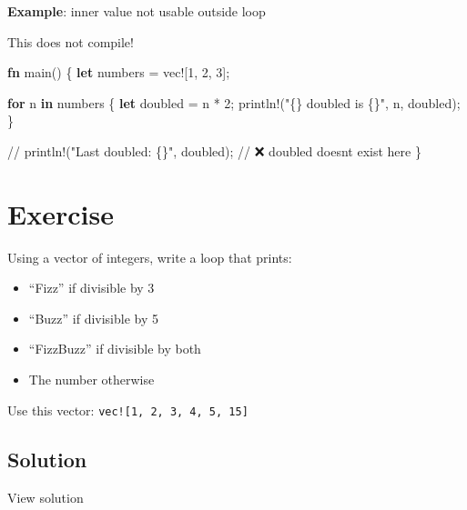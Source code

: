 \documentclass[
  letterpaper,
  DIV=11,
  numbers=noendperiod,
  oneside]{scrreprt}
\newenvironment{Shaded}{\begin{snugshade}}{\end{snugshade}}
\newcommand{\CommentTok}[1]{\textcolor[rgb]{0.37,0.37,0.37}{#1}}
\newcommand{\ControlFlowTok}[1]{\textcolor[rgb]{0.00,0.23,0.31}{\textbf{#1}}}
\newcommand{\DecValTok}[1]{\textcolor[rgb]{0.68,0.00,0.00}{#1}}
\newcommand{\KeywordTok}[1]{\textcolor[rgb]{0.00,0.23,0.31}{\textbf{#1}}}
\newcommand{\NormalTok}[1]{\textcolor[rgb]{0.00,0.23,0.31}{#1}}
\newcommand{\OperatorTok}[1]{\textcolor[rgb]{0.37,0.37,0.37}{#1}}
\newcommand{\PreprocessorTok}[1]{\textcolor[rgb]{0.68,0.00,0.00}{#1}}
\newcommand{\StringTok}[1]{\textcolor[rgb]{0.13,0.47,0.30}{#1}}
\providecommand{\tightlist}{%
  \setlength{\itemsep}{0pt}\setlength{\parskip}{0pt}}\usepackage{longtable,booktabs,array}
\begin{document}
\textbf{Example}: inner value not usable outside loop

This does not compile!

\begin{Shaded}
\begin{Highlighting}[]
\KeywordTok{fn}\NormalTok{ main() }\OperatorTok{\{}
    \KeywordTok{let}\NormalTok{ numbers }\OperatorTok{=} \PreprocessorTok{vec!}\NormalTok{[}\DecValTok{1}\OperatorTok{,} \DecValTok{2}\OperatorTok{,} \DecValTok{3}\NormalTok{]}\OperatorTok{;}

    \ControlFlowTok{for}\NormalTok{ n }\KeywordTok{in}\NormalTok{ numbers }\OperatorTok{\{}
        \KeywordTok{let}\NormalTok{ doubled }\OperatorTok{=}\NormalTok{ n }\OperatorTok{*} \DecValTok{2}\OperatorTok{;}
        \PreprocessorTok{println!}\NormalTok{(}\StringTok{"\{\} doubled is \{\}"}\OperatorTok{,}\NormalTok{ n}\OperatorTok{,}\NormalTok{ doubled)}\OperatorTok{;}
    \OperatorTok{\}}

    \CommentTok{// println!("Last doubled: \{\}", doubled); // ❌ \textasciigrave{}doubled\textasciigrave{} doesn\textquotesingle{}t exist here}
\OperatorTok{\}}
\end{Highlighting}
\end{Shaded}

\section{Exercise}\label{exercise-3}

Using a vector of integers, write a loop that prints:

\begin{itemize}
\tightlist
\item
  ``Fizz'' if divisible by 3
\item
  ``Buzz'' if divisible by 5
\item
  ``FizzBuzz'' if divisible by both
\item
  The number otherwise
\end{itemize}

Use this vector: \texttt{vec!{[}1,\ 2,\ 3,\ 4,\ 5,\ 15{]}}

\subsection{Solution}\label{solution-3}

View solution
\end{document}
